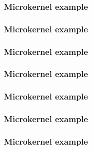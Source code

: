 
\begin{frame}
  \frametitle{Microkernel example}

  \begin{center}
  \end{center}
\end{frame}


\begin{frame}
  \frametitle{Microkernel example}

  \begin{center}
  \end{center}
\end{frame}


\begin{frame}
  \frametitle{Microkernel example}

  \begin{center}
  \end{center}
\end{frame}


\begin{frame}
  \frametitle{Microkernel example}

  \begin{center}
  \end{center}
\end{frame}


\begin{frame}
  \frametitle{Microkernel example}

  \begin{center}
  \end{center}
\end{frame}


\begin{frame}
  \frametitle{Microkernel example}

  \begin{center}
  \end{center}
\end{frame}


\begin{frame}
  \frametitle{Microkernel example}

  \begin{center}
  \end{center}
\end{frame}


